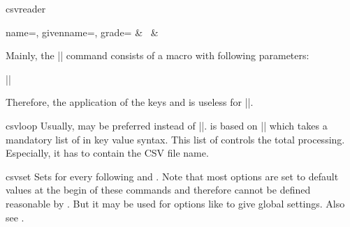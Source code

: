 \documentclass[a4paper,11pt]{ltxdoc}
\begin{document}
\begin{docCommand}{csvreader}{}
\begin{dispExample}
%
  {name=\name, givenname=\firstname, grade=\grade}{%
    \grade & \firstname~\name & \csvcoliii
  }
\end{dispExample}

Mainly, the |\csvreader| command consists of a  macro with
following parameters:\par
||\par
  Therefore, the application of the keys  and 
is useless for |\csvreader|.
\end{docCommand}


\clearpage
\begin{docCommand}{csvloop}{}
  Usually,  may be preferred instead of |\csvloop|.
   is based on |\csvloop| which takes a mandatory list of
   in key value syntax.
  This list of  controls the total processing. Especially,
  it has to contain the CSV file name.
\begin{dispExample}
\end{dispExample}
\end{docCommand}


\begin{docCommand}[doc updated = 2021-06-25]{csvset}{}
  Sets  for every following
   and .
  Note that most options are set to default values at the begin of these
  commands and therefore cannot be defined reasonable by .
  But it may be used for options like 
  to give global settings. Also see .
\end{docCommand}
\end{document}
